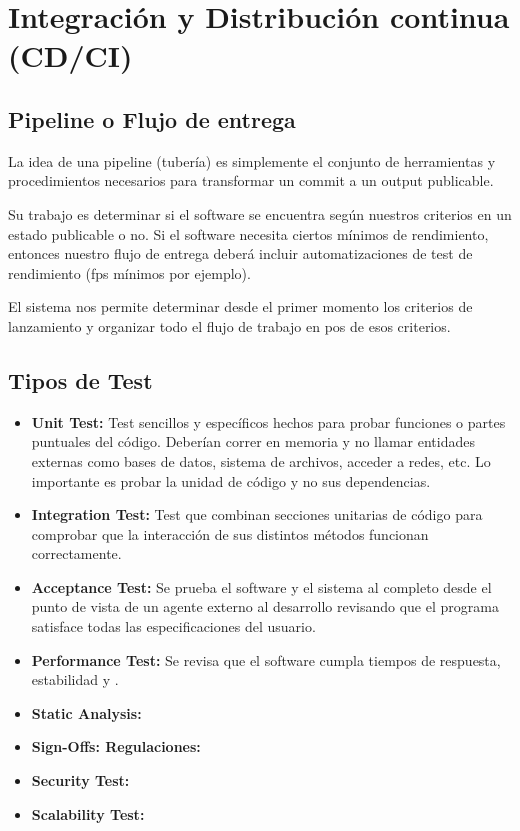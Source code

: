 
\section{Integración y Distribución continua (CD/CI)}\label{cdci:entrega-continua}

\subsection{Pipeline o Flujo de entrega}\label{cdci:flujo-de-entrega}

La idea de una pipeline (tubería) es simplemente el conjunto de herramientas y
procedimientos necesarios para transformar un commit a un output publicable.

Su trabajo es determinar si el software se encuentra según nuestros criterios
en un estado publicable o no. Si el software necesita ciertos mínimos de
rendimiento, entonces nuestro flujo de entrega deberá incluir automatizaciones
de test de rendimiento (fps mínimos por ejemplo).

El sistema nos permite determinar desde el primer momento los criterios de
lanzamiento y organizar todo el flujo de trabajo en pos de esos criterios.

\subsection{Tipos de Test}\label{cdci:tipos-de-test}

\begin{itemize}
  \item \textbf{Unit Test:} Test sencillos y específicos hechos para probar funciones o partes puntuales del código. Deberían correr en memoria y no llamar entidades externas como bases de datos, sistema de archivos, acceder a redes, etc. Lo importante es probar la unidad de código y no sus dependencias.
  \item \textbf{Integration Test:} Test que combinan secciones unitarias de código para comprobar que la interacción de sus distintos métodos funcionan correctamente.
  \item \textbf{Acceptance Test:} Se prueba el software y el sistema al completo desde el punto de vista de un agente externo al desarrollo revisando que el programa satisface todas las especificaciones del usuario.
  \item \textbf{Performance Test:} Se revisa que el software cumpla tiempos de respuesta, estabilidad y .
  \item \textbf{Static Analysis:} 
  \item \textbf{Sign-Offs: Regulaciones:} 
  \item \textbf{Security Test:} 
  \item \textbf{Scalability Test:} 
\end{itemize}

